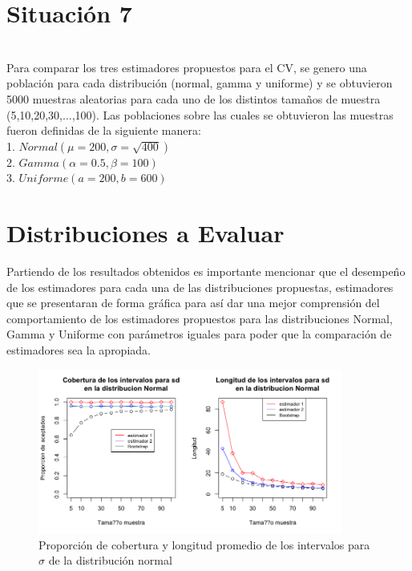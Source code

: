 \documentclass[letterpaper,12pt,onecolumn,titlepage]{article}
\begin{document}
\pagebreak\section{Situaci\'{o}n 7}
~\\ Para comparar los tres estimadores propuestos para el CV, se genero una poblaci\'{o}n para cada distribuci\'{o}n (normal, gamma y uniforme) y se obtuvieron 5000 muestras aleatorias para cada uno de los distintos tama\~{n}os de muestra (5,10,20,30,...,100). Las poblaciones sobre las cuales se obtuvieron las muestras fueron definidas de la siguiente manera:
~\\ 1. $Normal(\mu=200,\sigma=\sqrt{400})$
~\\ 2. $Gamma(\alpha=0.5,\beta=100)$
~\\ 3. $Uniforme(a=200,b=600)$

\section*{Distribuciones a Evaluar}
Partiendo de los resultados obtenidos es importante mencionar que el desempe\^{n}o de los estimadores para cada una de las distribuciones propuestas, estimadores que se presentaran de forma gr\'{a}fica para as\'{i} dar una mejor comprensi\'{o}n del comportamiento de los estimadores propuestos para las distribuciones Normal, Gamma y Uniforme con par\'{a}metros iguales para poder que la comparaci\'{o}n de estimadores sea la apropiada.  

\pagebreak
\begin{figure}[!h]
    \begin{center}
        \includegraphics[width=10cm]{Figuras/Rplot.png}
        \caption{Proporci\'{o}n de cobertura y longitud promedio de los intervalos para $\sigma$ de la distribuci\'{o}n normal}
        \label{fig:Densidad}
    \end{center}
\end{figure}
\end{document}
